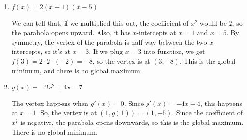 \documentclass{article}
\begin{document}
\begin{enumerate}[resume]
  \begin{enumerate}
  \item
    \begin{problem}[\vfill]
      $f(x) = 2 (x - 1) (x - 5)$
    \end{problem}

    \begin{solution}
      We can tell that, if we multiplied this out, the coefficient of $x^2$ would be $2$, so the parabola opens upward. Also, it has $x$-intercepts at $x = 1$ and $x = 5$. By symmetry, the vertex of the parabola is half-way between the two $x$-intercepts, so it's at $x = 3$. If we plug $x = 3$ into function, we get $f(3) = 2 \cdot 2 \cdot (-2) = -8$, so the vertex is at $(3, -8)$. This is the global minimum, and there is no global maximum.
      \begin{center}
      \end{center}
    \end{solution}

  \item
    \begin{problem}[\vfill]
      $g(x) = -2x^2 + 4x - 7$
    \end{problem}

    \begin{solution}
      The vertex happens when $g'(x)=0$. Since $g'(x) = -4x+4$, this happens at $x = 1$. So, the vertex is at $(1, g(1)) = (1, -5)$.
      Since the coefficient of $x^2$ is negative, the parabola opens
      downwards, so this is the global maximum. There is no global minimum.
      \begin{center}
      \end{center}
    \end{solution}



\end{enumerate}
\end{enumerate}
\end{document}
